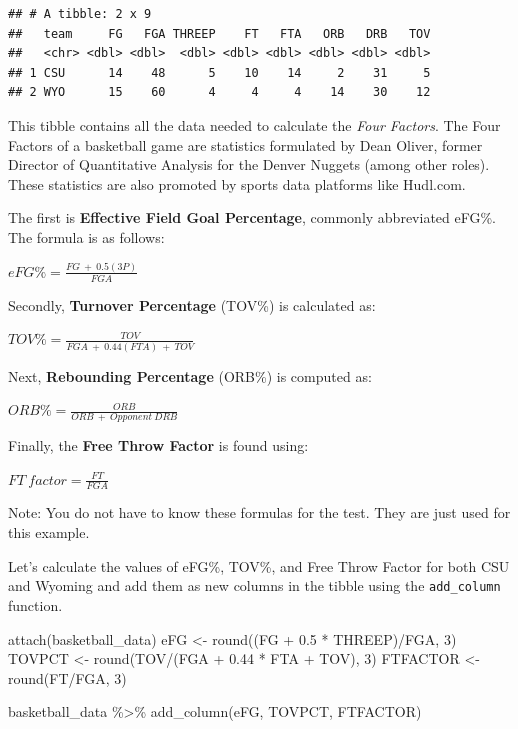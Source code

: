 \documentclass[
  11pt,
]{book}
\newenvironment{Shaded}{\begin{snugshade}}{\end{snugshade}}
\newcommand{\DecValTok}[1]{\textcolor[rgb]{0.00,0.00,0.81}{#1}}
\newcommand{\FloatTok}[1]{\textcolor[rgb]{0.00,0.00,0.81}{#1}}
\newcommand{\FunctionTok}[1]{\textcolor[rgb]{0.00,0.00,0.00}{#1}}
\newcommand{\NormalTok}[1]{#1}
\newcommand{\OtherTok}[1]{\textcolor[rgb]{0.56,0.35,0.01}{#1}}
\newcommand{\SpecialCharTok}[1]{\textcolor[rgb]{0.00,0.00,0.00}{#1}}
\theoremstyle{definition}
\theoremstyle{definition}
\theoremstyle{definition}
\theoremstyle{definition}
\theoremstyle{remark}
\begin{document}
\begin{verbatim}
## # A tibble: 2 x 9
##   team     FG   FGA THREEP    FT   FTA   ORB   DRB   TOV
##   <chr> <dbl> <dbl>  <dbl> <dbl> <dbl> <dbl> <dbl> <dbl>
## 1 CSU      14    48      5    10    14     2    31     5
## 2 WYO      15    60      4     4     4    14    30    12
\end{verbatim}

This tibble contains all the data needed to calculate the \emph{Four Factors}. The Four Factors of a basketball game are statistics formulated by Dean Oliver, former Director of Quantitative Analysis for the Denver Nuggets (among other roles). These statistics are also promoted by sports data platforms like Hudl.com.

The first is \textbf{Effective Field Goal Percentage}, commonly abbreviated eFG\%. The formula is as follows:

\(eFG\% = \frac{FG\ +\ 0.5(3P)}{FGA}\)

Secondly, \textbf{Turnover Percentage} (TOV\%) is calculated as:

\(TOV\% = \frac{TOV}{FGA\ +\ 0.44(FTA)\ +\ TOV}\)

Next, \textbf{Rebounding Percentage} (ORB\%) is computed as:

\(ORB\% = \frac{ORB}{ORB\ +\ Opponent\ DRB}\)

Finally, the \textbf{Free Throw Factor} is found using:

\(FT\ factor = \frac{FT}{FGA}\)

Note: You do not have to know these formulas for the test. They are just used for this example.

Let's calculate the values of eFG\%, TOV\%, and Free Throw Factor for both CSU and Wyoming and add them as new columns in the tibble using the \texttt{add\_column} function.

\begin{Shaded}
\begin{Highlighting}[]
\FunctionTok{attach}\NormalTok{(basketball\_data)}
\NormalTok{eFG }\OtherTok{\textless{}{-}} \FunctionTok{round}\NormalTok{((FG }\SpecialCharTok{+} \FloatTok{0.5} \SpecialCharTok{*}\NormalTok{ THREEP)}\SpecialCharTok{/}\NormalTok{FGA, }\DecValTok{3}\NormalTok{)}
\NormalTok{TOVPCT }\OtherTok{\textless{}{-}} \FunctionTok{round}\NormalTok{(TOV}\SpecialCharTok{/}\NormalTok{(FGA }\SpecialCharTok{+} \FloatTok{0.44} \SpecialCharTok{*}\NormalTok{ FTA }\SpecialCharTok{+}\NormalTok{ TOV), }\DecValTok{3}\NormalTok{)}
\NormalTok{FTFACTOR }\OtherTok{\textless{}{-}} \FunctionTok{round}\NormalTok{(FT}\SpecialCharTok{/}\NormalTok{FGA, }\DecValTok{3}\NormalTok{)}

\NormalTok{basketball\_data }\SpecialCharTok{\%\textgreater{}\%}
    \FunctionTok{add\_column}\NormalTok{(eFG, TOVPCT, FTFACTOR)}
\end{Highlighting}
\end{Shaded}
\end{document}
